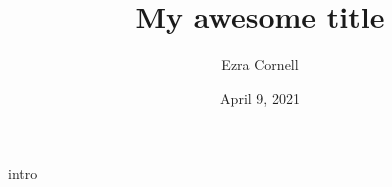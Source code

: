 \documentclass[12pt,aspectratio=1610]{beamer}
\title{My awesome title}
\date{April 9, 2021}
\author{Ezra Cornell}
\begin{document}

\makeatletter
{}
\makeatother

\maketitle


\begin{frame}{intro}
\end{frame}
\end{document}
